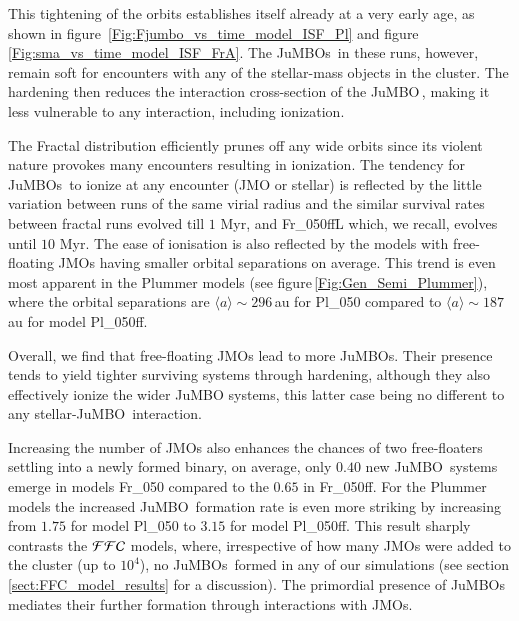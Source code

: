 \documentclass[submission,phys]{lib/SciPost}
\newcommand{\jumbo}{\mbox{JuMBO}}
\newcommand{\jumbos}{\mbox{JuMBOs}}
\begin{document}
This tightening of the orbits establishes itself already at a very early age, as shown in figure\, \ref{Fig:Fjumbo_vs_time_model_ISF_Pl} and figure 
\ref{Fig:sma_vs_time_model_ISF_FrA}.  The \jumbos\,
in these runs, however, remain soft for encounters with any of the
stellar-mass objects in the cluster. The hardening then reduces the
interaction cross-section of the \jumbo\,, making it less vulnerable
to any interaction, including ionization.

The Fractal distribution efficiently prunes off any wide orbits since
its violent nature provokes many encounters resulting in
ionization. The tendency for \jumbos\, to ionize at any encounter (JMO
or stellar) is reflected by the little variation between runs of the
same virial radius and the similar survival rates between fractal runs
evolved till $1$ Myr, and Fr\_050ffL which, we recall, evolves until
$10$ Myr.  The ease of ionisation is also reflected by the models with
free-floating JMOs having smaller orbital separations on average.
This trend is even most apparent in the Plummer models (see
figure\,\ref{Fig:Gen_Semi_Plummer}), where the orbital separations are
$\langle a\rangle\sim296$\,au for Pl\_050 compared to $\langle
a\rangle\sim187$ au for model Pl\_050ff.

Overall, we find that free-floating JMOs lead to more \jumbos.  Their
presence tends to yield tighter surviving systems through hardening,
although they also effectively ionize the wider JuMBO systems, this
latter case being no different to any stellar-\jumbo\ interaction.

Increasing the number of JMOs also enhances the chances of two
free-floaters settling into a newly formed binary, on average, only
$0.40$ new \jumbo\, systems emerge in models Fr\_050 compared to the
$0.65$ in Fr\_050ff. For the Plummer models the increased \jumbo\,
formation rate is even more striking by increasing from $1.75$ for
model Pl\_050 to $3.15$ for model Pl\_050ff.  This result sharply
contrasts the ${\cal FFC}$ models, where, irrespective of how many
JMOs were added to the cluster (up to $10^4$), no \jumbos\, formed in any
of our simulations (see section\,\ref{sect:FFC_model_results} for a
discussion). The primordial presence of \jumbos\, mediates their
further formation through interactions with JMOs.
\end{document}
